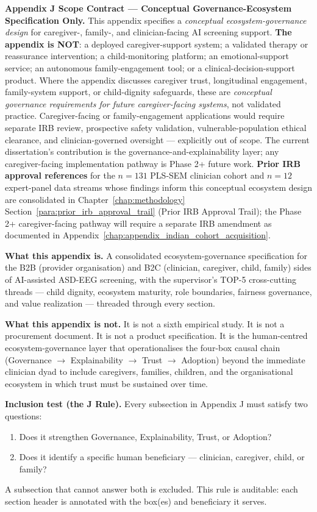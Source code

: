 \noindent\textbf{Appendix J Scope Contract --- Conceptual Governance-Ecosystem Specification Only.}
\label{para:appj_scope_contract}
This appendix specifies a \emph{conceptual ecosystem-governance design} for caregiver-, family-, and clinician-facing AI screening support. \textbf{The appendix is NOT}: a deployed caregiver-support system; a validated therapy or reassurance intervention; a child-monitoring platform; an emotional-support service; an autonomous family-engagement tool; or a clinical-decision-support product. Where the appendix discusses caregiver trust, longitudinal engagement, family-system support, or child-dignity safeguards, these are \emph{conceptual governance requirements for future caregiver-facing systems}, not validated practice. Caregiver-facing or family-engagement applications would require separate IRB review, prospective safety validation, vulnerable-population ethical clearance, and clinician-governed oversight --- explicitly out of scope. The current dissertation's contribution is the governance-and-explainability layer; any caregiver-facing implementation pathway is Phase 2+ future work. \textbf{Prior IRB approval references} for the $n{=}131$ PLS-SEM clinician cohort and $n{=}12$ expert-panel data streams whose findings inform this conceptual ecosystem design are consolidated in Chapter~\ref{chap:methodology} Section~\ref{para:prior_irb_approval_trail} (Prior IRB Approval Trail); the Phase 2+ caregiver-facing pathway will require a separate IRB amendment as documented in Appendix~\ref{chap:appendix_indian_cohort_acquisition}.

\noindent\textbf{What this appendix is.} A consolidated ecosystem-governance specification for the B2B (provider organisation) and B2C (clinician, caregiver, child, family) sides of AI-assisted ASD-EEG screening, with the supervisor's TOP-5 cross-cutting threads --- child dignity, ecosystem maturity, role boundaries, fairness governance, and value realization --- threaded through every section.

\noindent\textbf{What this appendix is not.} It is not a sixth empirical study. It is not a procurement document. It is not a product specification. It is the human-centred ecosystem-governance layer that operationalises the four-box causal chain (Governance $\to$ Explainability $\to$ Trust $\to$ Adoption) beyond the immediate clinician dyad to include caregivers, families, children, and the organisational ecosystem in which trust must be sustained over time.

\noindent\textbf{Inclusion test (the J Rule).} Every subsection in Appendix J must satisfy two questions:
\begin{enumerate}[noitemsep,topsep=0pt]
\item Does it strengthen Governance, Explainability, Trust, or Adoption?
\item Does it identify a specific human beneficiary --- clinician, caregiver, child, or family?
\end{enumerate}
A subsection that cannot answer both is excluded. This rule is auditable: each section header is annotated with the box(es) and beneficiary it serves.

